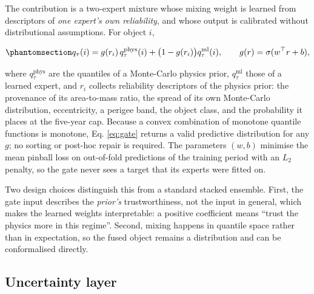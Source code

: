 \documentclass[3p,times,twocolumn]{elsarticle}
\begin{document}
The contribution is a two-expert mixture whose mixing weight is learned
from descriptors of \emph{one expert's own reliability}, and whose
output is calibrated without distributional assumptions. For object
\(i\),

\begin{equation}\protect\phantomsection\label{eq:gate}{q_\tau(i) = g(r_i)\, q^{\text{phys}}_\tau(i) + \bigl(1 - g(r_i)\bigr) q^{\text{ml}}_\tau(i), \qquad g(r) = \sigma(w^\top r + b),}\end{equation}

where \(q^{\text{phys}}_\tau\) are the quantiles of a Monte-Carlo
physics prior, \(q^{\text{ml}}_\tau\) those of a learned expert, and
\(r_i\) collects reliability descriptors of the physics prior: the
provenance of its area-to-mass ratio, the spread of its own Monte-Carlo
distribution, eccentricity, a perigee band, the object class, and the
probability it places at the five-year cap. Because a convex combination
of monotone quantile functions is monotone, Eq. \ref{eq:gate} returns a
valid predictive distribution for any \(g\); no sorting or post-hoc
repair is required. The parameters \((w,b)\) minimise the mean pinball
loss on out-of-fold predictions of the training period with an \(L_2\)
penalty, so the gate never sees a target that its experts were fitted
on.

Two design choices distinguish this from a standard stacked ensemble.
First, the gate input describes the \emph{prior's} trustworthiness, not
the input in general, which makes the learned weights interpretable: a
positive coefficient means ``trust the physics more in this regime''.
Second, mixing happens in quantile space rather than in expectation, so
the fused object remains a distribution and can be conformalised
directly.

\subsection{Uncertainty layer}\label{uncertainty-layer}
\end{document}
